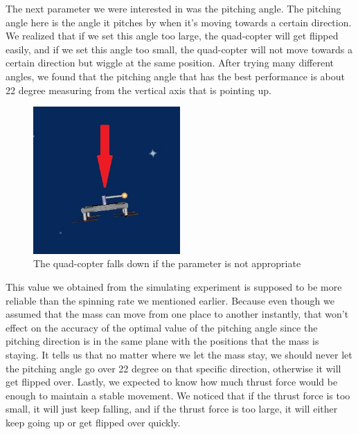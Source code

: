 \newline
\newline
The next parameter we were interested in was the pitching angle. The pitching angle here is the angle it pitches by when it’s moving towards a certain direction.
\newline
\newline
We realized that if we set this angle too large, the quad-copter will get flipped easily, and if we set this angle too small, the quad-copter will not move towards a certain direction but wiggle at the same position.
\newline
\newline
After trying many different angles, we found that the pitching angle that has the best performance is about 22 degree measuring from the vertical axis that is pointing up.
\begin{figure}[h]
\centering
\includegraphics[width=0.5\textwidth]{./Lin_img/9.jpg}
\caption{The quad-copter falls down if the parameter is not appropriate}
\end{figure}
\newline
This value we obtained from the simulating experiment is supposed to be more reliable than the spinning rate we mentioned earlier. Because even though we assumed that the mass can move from one place to another instantly, that won’t effect on the accuracy of the optimal value of the pitching angle since the pitching direction is in the same plane with the positions that the mass is staying. 
\newline
\newline
It tells us that no matter where we let the mass stay, we should never let the pitching angle go over 22 degree on that specific direction, otherwise it will get flipped over.
\newline
\newline
Lastly, we expected to know how much thrust force would be enough to maintain a stable movement. We noticed that if the thrust force is too small, it will just keep falling, and if the thrust force is too large, it will either keep going up or get flipped over quickly. 

